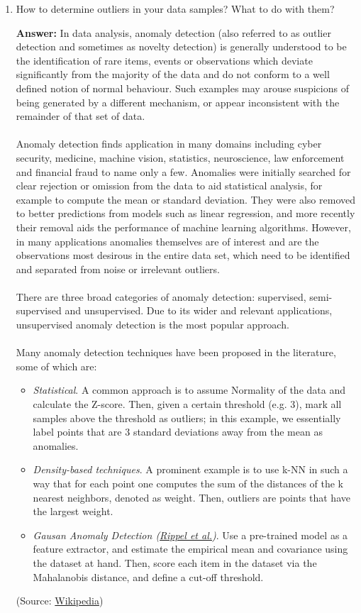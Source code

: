 \documentclass{article}
\newenvironment{QandA}{\begin{enumerate}[label=\arabic*.]}{\end{enumerate}}
\newenvironment{answer}{\par\normalfont \textbf{Answer:}}{}
\begin{document}
\begin{QandA}
    \item How to determine outliers in your data samples? What to do with them?
    \begin{answer}
        In data analysis, anomaly detection (also referred to as outlier detection and sometimes as novelty detection) is generally understood to be the identification of rare items, events or observations which deviate significantly from the majority of the data and do not conform to a well defined notion of normal behaviour. Such examples may arouse suspicions of being generated by a different mechanism, or appear inconsistent with the remainder of that set of data. \\\\
        Anomaly detection finds application in many domains including cyber security, medicine, machine vision, statistics, neuroscience, law enforcement and financial fraud to name only a few. Anomalies were initially searched for clear rejection or omission from the data to aid statistical analysis, for example to compute the mean or standard deviation. They were also removed to better predictions from models such as linear regression, and more recently their removal aids the performance of machine learning algorithms. However, in many applications anomalies themselves are of interest and are the observations most desirous in the entire data set, which need to be identified and separated from noise or irrelevant outliers. \\\\
        There are three broad categories of anomaly detection: supervised, semi-supervised and unsupervised. Due to its wider and relevant applications, unsupervised anomaly detection is the most popular approach. \\\\
        Many anomaly detection techniques have been proposed in the literature, some of which are:
        \begin{itemize}
            \item \textit{Statistical}. A common approach is to assume Normality of the data and calculate the Z-score. Then, given a certain threshold (e.g. 3), mark all samples above the threshold as outliers; in this example, we essentially label points that are 3 standard deviations away from the mean as anomalies. 
            \item \textit{Density-based techniques}. A prominent example is to use k-NN in such a way that for each point one computes the sum of the distances of the k nearest neighbors, denoted as weight. Then, outliers are points that have the largest weight. 
            \item \textit{Gausan Anomaly Detection (\href{https://ieeexplore.ieee.org/document/9493210}{Rippel et al.})}. Use a pre-trained model as a feature extractor, and estimate the empirical mean and covariance using the dataset at hand. Then, score each item in the dataset via the Mahalanobis distance, and define a cut-off threshold. 
        \end{itemize}
        (Source: \href{https://en.wikipedia.org/wiki/Anomaly_detection}{Wikipedia})
    \end{answer}


\end{QandA}
\end{document}
